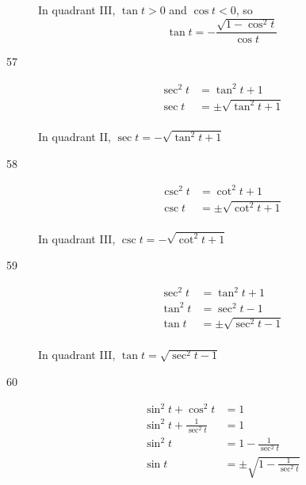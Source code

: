 \documentclass{exam}
\begin{document}
\begin{description}

        In quadrant III, $\tan t > 0$ and $\cos t < 0$, so 
        \[
          \tan t = \boxed{ - \frac{\sqrt{ 1 - \cos^2 t }}{\cos t} }
        \]

      \pagebreak

      \item[57] 
        \begin{align*}
          \sec^2 t & = \tan^2 t + 1 \\
          \sec t   & = \pm \sqrt{\tan^2 t + 1} \\
        \end{align*}

        In quadrant II, $\sec t = \boxed{ - \sqrt{\tan^2 t + 1} }$ 

      \item[58] 
        \begin{align*}
          \csc^2 t & = \cot^2 t + 1 \\
          \csc t   & = \pm \sqrt{\cot^2 t + 1} \\
        \end{align*}

        In quadrant III, $\csc t = \boxed{ - \sqrt{\cot^2 t + 1} }$ 

      \item[59] 
        \begin{align*}
          \sec^2 t & = \tan^2 t + 1 \\
          \tan^2 t & = \sec^2 t - 1 \\
          \tan t   & = \pm \sqrt{ \sec^2 t - 1 } \\
        \end{align*}

        In quadrant III, $\tan t = \boxed{\sqrt{ \sec^2 t - 1 }}$ 

      \item[60] 
        \begin{align*}
          \sin^2 t + \cos^2 t           & = 1 \\
          \sin^2 t + \frac{1}{\sec^2 t} & = 1 \\
          \sin^2 t                      & = 1 - \frac{1}{\sec^2 t} \\
          \sin t                        & = \pm \sqrt{ 1 - \frac{1}{\sec^2 t} } \\
        \end{align*}


\end{description}
\end{document}
